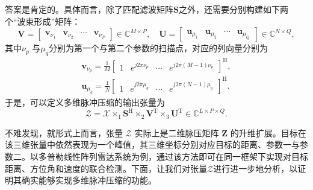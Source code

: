 答案是肯定的。具体而言，除了匹配滤波矩阵\( \mathbf{S} \)之外，还需要分别构建如下两个``波束形成''矩阵：
\[
    \mathbf{V} = \begin{bmatrix}
        \bm{v}_{\nu_1} & \bm{v}_{\nu_2} & \cdots & \bm{v}_{\nu_P}
    \end{bmatrix} \in \mathbb{C}^{M \times P}, \quad
    \mathbf{U} = \begin{bmatrix}
        \bm{u}_{\mu_1} & \bm{u}_{\mu_2} & \cdots & \bm{u}_{\mu_Q}
    \end{bmatrix} \in \mathbb{C}^{N \times Q},
\]
其中\( \nu_p \) 与\( \mu_q \)分别为第一个与第二个参数的扫描点，对应的列向量分别为
\[
    \begin{split}
        \bm{v}_{\nu_p} = \frac{1}{M} \begin{bmatrix}
                                         1 & e^{j2\pi\nu_p} & \cdots & e^{j2\pi(M-1)\nu_p}
                                     \end{bmatrix}^{\mathrm{H}}, \\
        \bm{u}_{\mu_q} = \frac{1}{N} \begin{bmatrix}
                                         1 & e^{j2\pi\mu_q} & \cdots & e^{j2\pi(N-1)\mu_q}
                                     \end{bmatrix}^{\mathrm{H}}.
    \end{split}
\]
于是，可以定义多维脉冲压缩的输出张量为
\[
    \mathcal{Z} = \mathcal{X} \times_1 \mathbf{S}^{\mathrm{H}} \times_2 \mathbf{V}^{\mathrm{T}} \times_3 \mathbf{U}^{\mathrm{T}} \in \mathbb{C}^{L \times P \times Q}.
\]

不难发现，就形式上而言，张量 \( \mathcal{Z} \) 实际上是二维脉压矩阵 \( \mathbf{Z} \) 的升维扩展。目标在该三维张量中依然表现为一个峰值，其三维坐标分别对应目标的距离、参数一与参数二。以多普勒线性阵列雷达系统为例，通过该方法即可在同一框架下实现对目标距离、方位角和速度的联合检测。下面，让我们对张量\( \mathcal{Z} \)进行进一步地分析，以证明其确实能够实现多维脉冲压缩的功能。

